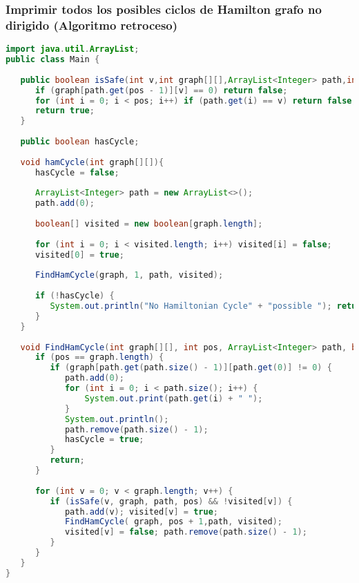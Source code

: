 \subsubsection{Imprimir todos los posibles ciclos de Hamilton grafo no dirigido (Algoritmo retroceso)}
\begin{lstlisting}[language=Java]
import java.util.ArrayList;
public class Main {
	
   public boolean isSafe(int v,int graph[][],ArrayList<Integer> path,int pos){
      if (graph[path.get(pos - 1)][v] == 0) return false;
      for (int i = 0; i < pos; i++) if (path.get(i) == v) return false;
      return true;
   }
	
   public boolean hasCycle;
	
   void hamCycle(int graph[][]){
      hasCycle = false;
		
      ArrayList<Integer> path = new ArrayList<>();
      path.add(0);
		
      boolean[] visited = new boolean[graph.length];
		
      for (int i = 0; i < visited.length; i++) visited[i] = false;
      visited[0] = true;
		
      FindHamCycle(graph, 1, path, visited);
		
      if (!hasCycle) {
         System.out.println("No Hamiltonian Cycle" + "possible "); return;
      }
   }
	
   void FindHamCycle(int graph[][], int pos, ArrayList<Integer> path, boolean[] visited){
      if (pos == graph.length) {
         if (graph[path.get(path.size() - 1)][path.get(0)] != 0) {
            path.add(0);
            for (int i = 0; i < path.size(); i++) {
            	System.out.print(path.get(i) + " ");
            }
            System.out.println();
            path.remove(path.size() - 1);
            hasCycle = true;
         }
         return;
      }
		
      for (int v = 0; v < graph.length; v++) {
         if (isSafe(v, graph, path, pos) && !visited[v]) {
            path.add(v); visited[v] = true;
            FindHamCycle( graph, pos + 1,path, visited);
            visited[v] = false; path.remove(path.size() - 1);
         }
      }
   }
}

\end{lstlisting}


